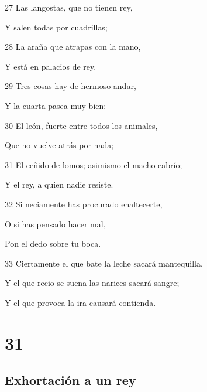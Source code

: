 \par 27 Las langostas, que no tienen rey,
\par Y salen todas por cuadrillas; 
\par 28 La araña que atrapas con la mano,
\par Y está en palacios de rey.
\par 29 Tres cosas hay de hermoso andar,
\par Y la cuarta pasea muy bien: 
\par 30 El león, fuerte entre todos los animales,
\par Que no vuelve atrás por nada;
\par 31 El ceñido de lomos; asimismo el macho cabrío;
\par Y el rey, a quien nadie resiste.
\par 32 Si neciamente has procurado enaltecerte,
\par O si has pensado hacer mal,
\par Pon el dedo sobre tu boca.
\par 33 Ciertamente el que bate la leche sacará mantequilla,
\par Y el que recio se suena las narices sacará sangre;
\par Y el que provoca la ira causará contienda.

\chapter{31}

\section*{Exhortación a un rey}


